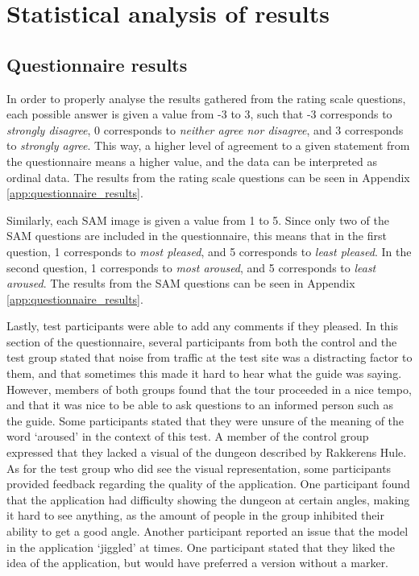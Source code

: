 
\section{Statistical analysis of results} 
\subsection{Questionnaire results}
In order to properly analyse the results gathered from the rating scale questions, each possible answer is given a value from -3 to 3, such that -3 corresponds to \textit{strongly disagree}, 0 corresponds to \textit{neither agree nor disagree}, and 3 corresponds to \textit{strongly agree}. This way, a higher level of agreement to a given statement from the questionnaire means a higher value, and the data can be interpreted as ordinal data. The results from the rating scale questions can be seen in Appendix \ref{app:questionnaire_results}.
 
Similarly, each SAM image is given a value from 1 to 5. Since only two of the SAM questions are included in the questionnaire, this means that in the first question, 1 corresponds to \textit{most pleased}, and 5 corresponds to \textit{least pleased}. In the second question, 1 corresponds to \textit{most aroused}, and 5 corresponds to \textit{least aroused}. The results from the SAM questions can be seen in Appendix \ref{app:questionnaire_results}.
 
Lastly, test participants were able to add any comments if they pleased. In this section of the questionnaire, several participants from both the control and the test group stated that noise from traffic at the test site was a distracting factor to them, and that sometimes this made it hard to hear what the guide was saying. However, members of both groups found that the tour proceeded in a nice tempo, and that it was nice to be able to ask questions to an informed person such as the guide. Some participants stated that they were unsure of the meaning of the word ‘aroused’ in the context of this test. A member of the control group expressed that they lacked a visual of the dungeon described by Rakkerens Hule. As for the test group who did see the visual representation, some participants provided feedback regarding the quality of the application. One participant found that the application had difficulty showing the dungeon at certain angles, making it hard to see anything, as the amount of people in the group inhibited their ability to get a good angle. Another participant reported an issue that the model in the application ‘jiggled’ at times. One participant stated that they liked the idea of the application, but would have preferred a version without a marker.
 
